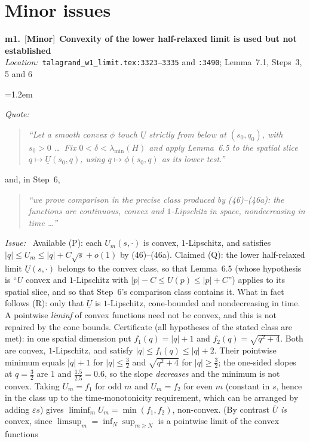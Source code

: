 \documentclass[11pt]{article}
\newcommand{\sevMin}{\textcolor{Goldenrod!60!black}{\textbf{Minor}}}
\newenvironment{finding}[4]{%
  \par\medskip\noindent
  \textbf{#1.}~[#2]~\textbf{#4}\\
  \noindent\textit{Location:}~#3\par\nopagebreak\begin{list}{}{\leftmargin=1.2em\itemsep=2pt\parsep=0pt}}%
  {\end{list}\medskip}
\newcommand{\field}[1]{\item[]\textit{#1:}~}
\newenvironment{mquote}{\begin{quote}\itshape}{\end{quote}}
\begin{document}
\section*{Minor issues}

\begin{finding}{m1}{\sevMin}{\texttt{talagrand\_w1\_limit.tex:3323--3335} and \texttt{:3490}; Lemma~7.1, Steps~3, 5 and 6}{Convexity of the lower half-relaxed limit is used but not established}
  \field{Quote}
  \begin{mquote}
    ``Let a smooth convex $\phi$ touch $\underline U$ strictly from below at $(s_0,q_0)$, with
    $s_0>0$ \dots\ Fix $0<\delta<\lambda_{\min}(H)$ and apply Lemma~6.5 to the spatial slice
    $q\mapsto\underline U(s_0,q)$, using $q\mapsto\phi(s_0,q)$ as its lower test.''
  \end{mquote}
  and, in Step~6,
  \begin{mquote}
    ``we prove comparison in the precise class produced by (46)--(46a): the functions are
    continuous, convex and $1$-Lipschitz in space, nondecreasing in time \dots''
  \end{mquote}
  \field{Issue} Available (P): each $U_m(s,\cdot)$ is convex, $1$-Lipschitz, and satisfies
  $|q|\le U_m\le|q|+C\sqrt s+o(1)$ by (46)--(46a). Claimed (Q): the lower half-relaxed limit
  $\underline U(s,\cdot)$ belongs to the convex class, so that Lemma~6.5 (whose hypothesis is
  ``$U$ convex and $1$-Lipschitz with $|p|-C\le U(p)\le|p|+C$'') applies to its spatial slice,
  and so that Step~6's comparison class contains it. What in fact follows (R): only that
  $\underline U$ is $1$-Lipschitz, cone-bounded and nondecreasing in time. A pointwise
  \emph{liminf} of convex functions need not be convex, and this is not repaired by the cone
  bounds. Certificate (all hypotheses of the stated class are met): in one spatial dimension put
  $f_1(q)=|q|+1$ and $f_2(q)=\sqrt{q^2+4}$. Both are convex, $1$-Lipschitz, and satisfy
  $|q|\le f_i(q)\le|q|+2$. Their pointwise minimum equals $|q|+1$ for $|q|\le\frac32$ and
  $\sqrt{q^2+4}$ for $|q|\ge\frac32$; the one-sided slopes at $q=\frac32$ are $1$ and
  $\frac{1.5}{2.5}=0.6$, so the slope \emph{decreases} and the minimum is not convex. Taking
  $U_m=f_1$ for odd $m$ and $U_m=f_2$ for even $m$ (constant in $s$, hence in the class up to the
  time-monotonicity requirement, which can be arranged by adding $\varepsilon s$) gives
  $\liminf_mU_m=\min(f_1,f_2)$, non-convex. (By contrast $\overline U$ \emph{is} convex, since
  $\limsup_m=\inf_N\sup_{m\ge N}$ is a pointwise limit of the convex functions

\end{finding}
\end{document}
